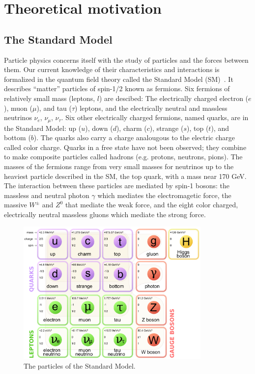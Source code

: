 \clearpage
\section{Theoretical motivation\label{sec:theory}}

\subsection{The Standard Model\label{sec:SM}}

Particle physics concerns itself with the study of particles and the 
forces between them. Our current knowledge of their characteristics and 
interactions is formalized in the quantum field theory called the Standard Model 
(SM)~\cite{bettini2014introduction,griffiths2008introduction}.
It describes ``matter'' particles of spin-1/2 known as 
fermions. Six fermions of relatively small mass (leptons, $l$) are descibed:
The electrically charged electron ($e$), muon ($\mu$), and tau ($\tau$) 
leptons, and the electrically neutral and massless neutrinos 
$\nu_{e}$, $\nu_{\mu}$, $\nu_{\tau}$.  
Six other electrically charged 
fermions, named quarks, are in the Standard Model: up ($u$), down ($d$), 
charm ($c$), strange ($s$), top ($t$), and bottom ($b$). The quarks also carry
a charge analougous to the electric charge called color charge. Quarks in a 
free state have not been observed; they combine to make composite
particles called hadrons (e.g. protons, neutrons, pions). The masses of the 
fermions range from very small masses for neutrinos up to the heaviest 
particle described in the SM, the top quark, with a mass near 170 GeV. \\
\indent The interaction between these particles are mediated by spin-1 bosons: 
the massless and neutral photon $\gamma$ which mediates the electromagetic force, 
the massive $W^\pm$ and $Z^0$ that mediate the weak force, and the eight color 
charged, electrically neutral massless gluons which mediate the strong force.

\begin{figure}[h!t]
  \begin{center}
       \includegraphics[width=0.85\textwidth,]{figures/Standard_Model_of_Elementary_Particles.png}
       \caption{The particles of the Standard Model.}
    \label{fig:SM-particles}
  \end{center}
\end{figure}

